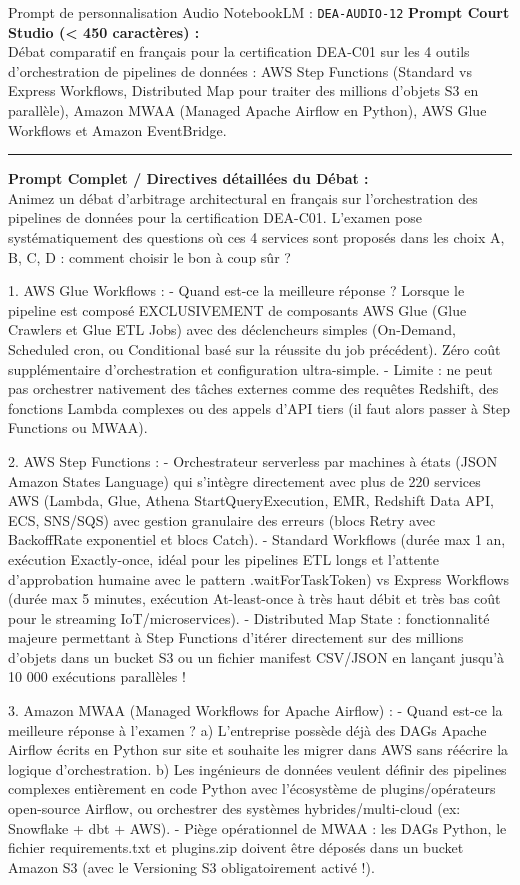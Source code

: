 \documentclass[11pt,a4paper]{article}
\begin{document}
\begin{promptbox}{Prompt de personnalisation Audio NotebookLM : \texttt{DEA-AUDIO-12}}
\textbf{Prompt Court Studio (< 450 caractères) :}\\
Débat comparatif en français pour la certification DEA-C01 sur les 4 outils d'orchestration de pipelines de données : AWS Step Functions (Standard vs Express Workflows, Distributed Map pour traiter des millions d'objets S3 en parallèle), Amazon MWAA (Managed Apache Airflow en Python), AWS Glue Workflows et Amazon EventBridge.

\medskip\hrule\medskip
\textbf{Prompt Complet / Directives détaillées du Débat :}\\
Animez un débat d'arbitrage architectural en français sur l'orchestration des pipelines de données pour la certification DEA-C01. L'examen pose systématiquement des questions où ces 4 services sont proposés dans les choix A, B, C, D : comment choisir le bon à coup sûr ?

1. AWS Glue Workflows :
- Quand est-ce la meilleure réponse ? Lorsque le pipeline est composé EXCLUSIVEMENT de composants AWS Glue (Glue Crawlers et Glue ETL Jobs) avec des déclencheurs simples (On-Demand, Scheduled cron, ou Conditional basé sur la réussite du job précédent). Zéro coût supplémentaire d'orchestration et configuration ultra-simple.
- Limite : ne peut pas orchestrer nativement des tâches externes comme des requêtes Redshift, des fonctions Lambda complexes ou des appels d'API tiers (il faut alors passer à Step Functions ou MWAA).

2. AWS Step Functions :
- Orchestrateur serverless par machines à états (JSON Amazon States Language) qui s'intègre directement avec plus de 220 services AWS (Lambda, Glue, Athena StartQueryExecution, EMR, Redshift Data API, ECS, SNS/SQS) avec gestion granulaire des erreurs (blocs Retry avec BackoffRate exponentiel et blocs Catch).
- Standard Workflows (durée max 1 an, exécution Exactly-once, idéal pour les pipelines ETL longs et l'attente d'approbation humaine avec le pattern .waitForTaskToken) vs Express Workflows (durée max 5 minutes, exécution At-least-once à très haut débit et très bas coût pour le streaming IoT/microservices).
- Distributed Map State : fonctionnalité majeure permettant à Step Functions d'itérer directement sur des millions d'objets dans un bucket S3 ou un fichier manifest CSV/JSON en lançant jusqu'à 10 000 exécutions parallèles !

3. Amazon MWAA (Managed Workflows for Apache Airflow) :
- Quand est-ce la meilleure réponse à l'examen ?
  a) L'entreprise possède déjà des DAGs Apache Airflow écrits en Python sur site et souhaite les migrer dans AWS sans réécrire la logique d'orchestration.
  b) Les ingénieurs de données veulent définir des pipelines complexes entièrement en code Python avec l'écosystème de plugins/opérateurs open-source Airflow, ou orchestrer des systèmes hybrides/multi-cloud (ex: Snowflake + dbt + AWS).
- Piège opérationnel de MWAA : les DAGs Python, le fichier requirements.txt et plugins.zip doivent être déposés dans un bucket Amazon S3 (avec le Versioning S3 obligatoirement activé !).


\end{promptbox}
\end{document}
